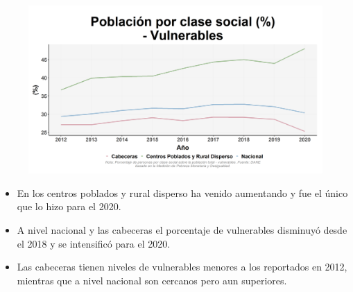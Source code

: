     \begin{figure}[H]
        \caption[Población por clase social - Vulnerables por zonas ]{\label{vulnerables_zonas} }
        \begin{center}
        \includegraphics[width=\textwidth,keepaspectratio]{img/var_246_trend.png}
        \end{center}
    \end{figure}
            \begin{itemize}
                    \item En los centros poblados y rural disperso ha venido aumentando y fue el único que lo hizo para el 2020.
                    \item A nivel nacional y las cabeceras el porcentaje de vulnerables disminuyó desde el 2018 y se intensificó para el 2020.
                    \item Las cabeceras tienen niveles de vulnerables menores a los reportados en 2012, mientras que a nivel nacional son cercanos pero aun superiores.
                    \end{itemize}

